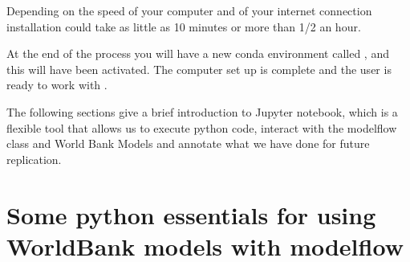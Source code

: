 \documentclass[letterpaper,10pt,english]{jupyterBook}
\begin{document}
\begin{sphinxVerbatim}[commandchars=\\\{\}]
          
  
  
     
    
   
   
   

\end{sphinxVerbatim}

\sphinxAtStartPar
Depending on the speed of your computer and of your internet connection installation could take as little as 10 minutes or more than 1/2 an hour.

\sphinxAtStartPar
At the end of the process you will have a new conda environment called , and this will have been activated. The computer set up is complete and the user is ready to work with .

\sphinxAtStartPar
The following sections give a brief introduction to Jupyter notebook, which is a flexible tool that allows us to execute python code, interact with the modelflow class and World Bank Models and annotate what we have done for future replication.

\sphinxstepscope


\part{Some python essentials for using WorldBank models with modelflow}

\sphinxstepscope
\end{document}
